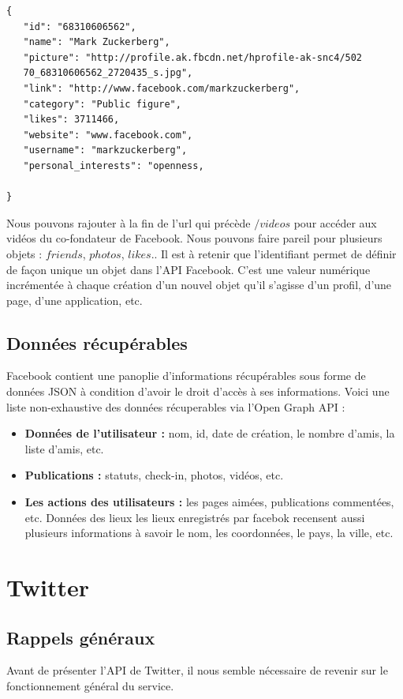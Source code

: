 \begin{verbatim}
{
   "id": "68310606562",
   "name": "Mark Zuckerberg",
   "picture": "http://profile.ak.fbcdn.net/hprofile-ak-snc4/502
   70_68310606562_2720435_s.jpg",
   "link": "http://www.facebook.com/markzuckerberg",
   "category": "Public figure",
   "likes": 3711466,
   "website": "www.facebook.com",
   "username": "markzuckerberg",
   "personal_interests": "openness,

}
\end{verbatim}
Nous pouvons rajouter à la fin de l'url qui précède \textbf{$/videos$} pour accéder aux vidéos du co-fondateur de Facebook. Nous pouvons faire pareil pour plusieurs objets : $friends$, $photos$, $likes$..
Il est à retenir que l'identifiant permet de définir de façon unique un objet dans l'API Facebook. C'est une valeur numérique incrémentée à chaque création d'un nouvel objet qu'il s'agisse d'un profil, d'une page, d'une application, etc. \\

\subsection{Données récupérables}
Facebook contient une panoplie d'informations récupérables sous forme de données JSON à condition d'avoir le droit d'accès à ses informations. Voici une liste non-exhaustive des données récuperables via l'Open Graph API : \\
\begin{itemize}
\item \textbf{Données de l’utilisateur :} nom, id, date de création, le nombre d'amis, la liste d'amis, etc.
\item  \textbf{Publications :} statuts, check-in, photos, vidéos, etc.
\item  \textbf{Les actions des utilisateurs :} les pages aimées, publications commentées, etc.
Données des lieux les lieux enregistrés par facebok recensent aussi plusieurs informations à savoir le nom,
les coordonnées, le pays, la ville, etc.
\end{itemize}


\section{Twitter}
    \subsection{Rappels généraux}
        Avant de présenter l'API de Twitter, il nous semble nécessaire de revenir sur le fonctionnement général du service. 
        
